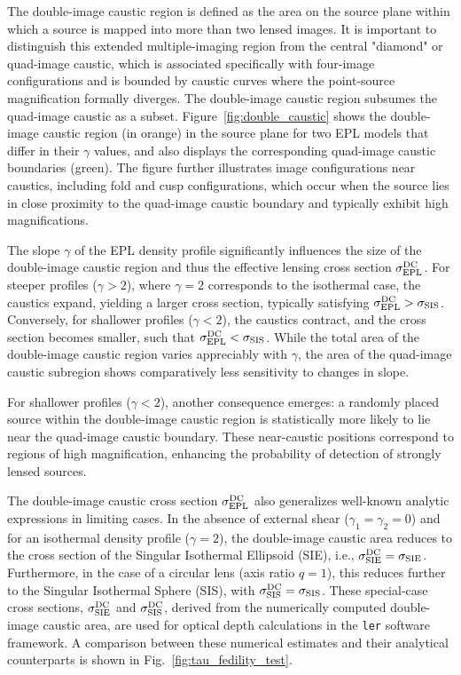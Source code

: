\documentclass[aps,prd,twocolumn,superscriptaddress,groupedaddress,nofootinbib,showpacs,eqsecnum]{revtex4-1}
\begin{document}
The double-image caustic region is defined as the area on the source plane within which a source is mapped into more than two lensed images. It is important to distinguish this extended multiple-imaging region from the central "diamond" or quad-image caustic, which is associated specifically with four-image configurations and is bounded by caustic curves where the point-source magnification formally diverges. The double-image caustic region subsumes the quad-image caustic as a subset. Figure~\ref{fig:double_caustic} shows the double-image caustic region (in orange) in the source plane for two EPL models that differ in their $\gamma$ values, and also displays the corresponding quad-image caustic boundaries (green). The figure further illustrates image configurations near caustics, including fold and cusp configurations, which occur when the source lies in close proximity to the quad-image caustic boundary and typically exhibit high magnifications.

The slope $\gamma$ of the EPL density profile significantly influences the size of the double-image caustic region and thus the effective lensing cross section $\sigma_{\rm EPL}^{\rm DC}$. For steeper profiles ($\gamma > 2$), where $\gamma = 2$ corresponds to the isothermal case, the caustics expand, yielding a larger cross section, typically satisfying $\sigma_{\rm EPL}^{\rm DC} > \sigma_{\rm SIS}$. Conversely, for shallower profiles ($\gamma < 2$), the caustics contract, and the cross section becomes smaller, such that $\sigma_{\rm EPL}^{\rm DC} < \sigma_{\rm SIS}$. While the total area of the double-image caustic region varies appreciably with $\gamma$, the area of the quad-image caustic subregion shows comparatively less sensitivity to changes in slope.

For shallower profiles ($\gamma < 2$), another consequence emerges: a randomly placed source within the double-image caustic region is statistically more likely to lie near the quad-image caustic boundary. These near-caustic positions correspond to regions of high magnification, enhancing the probability of detection of strongly lensed sources.

The double-image caustic cross section $\sigma_{\rm EPL}^{\rm DC}$ also generalizes well-known analytic expressions in limiting cases. In the absence of external shear ($\gamma_1 = \gamma_2 = 0$) and for an isothermal density profile ($\gamma = 2$), the double-image caustic area reduces to the cross section of the Singular Isothermal Ellipsoid (SIE), i.e., $\sigma_{\rm SIE}^{\rm DC} = \sigma_{\rm SIE}$. Furthermore, in the case of a circular lens (axis ratio $q = 1$), this reduces further to the Singular Isothermal Sphere (SIS), with $\sigma_{\rm SIS}^{\rm DC} = \sigma_{\rm SIS}$. These special-case cross sections, $\sigma_{\rm SIE}^{\rm DC}$ and $\sigma_{\rm SIS}^{\rm DC}$, derived from the numerically computed double-image caustic area, are used for optical depth calculations in the \texttt{ler} software framework. A comparison between these numerical estimates and their analytical counterparts is shown in Fig.~\ref{fig:tau_fedility_test}.
\end{document}
